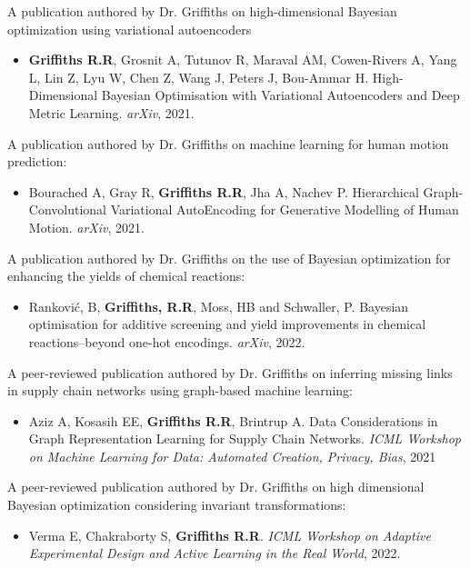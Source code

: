 \documentclass[11pt]{article}
\begin{document}
\begin{thebibliography}{9}
A publication authored by Dr. Griffiths on high-dimensional Bayesian optimization using variational autoencoders
\begin{itemize}
\item \textbf{Griffiths R.R}, Grosnit A, Tutunov R, Maraval AM, Cowen-Rivers A, Yang L, Lin Z, Lyu W, Chen Z, Wang J, Peters J, Bou-Ammar H. High-Dimensional Bayesian Optimisation with Variational Autoencoders and Deep Metric Learning. \textit{arXiv}, 2021.
\end{itemize}

A publication authored by Dr. Griffiths on machine learning for human motion prediction:
\begin{itemize}
\item Bourached A, Gray R, \textbf{Griffiths R.R}, Jha A, Nachev P. Hierarchical Graph-Convolutional Variational AutoEncoding for Generative Modelling of Human Motion. \textit{arXiv}, 2021.
\end{itemize}

A publication authored by Dr. Griffiths on the use of Bayesian optimization for enhancing the yields of chemical reactions:
\begin{itemize}
\item Ranković, B, \textbf{Griffiths, R.R}, Moss, HB and Schwaller, P. Bayesian optimisation for additive screening and yield improvements in chemical reactions–beyond one-hot encodings. \textit{arXiv}, 2022.
\end{itemize}

A peer-reviewed publication authored by Dr. Griffiths on inferring missing links in supply chain networks using graph-based machine learning:
\begin{itemize}
\item Aziz A, Kosasih EE, \textbf{Griffiths R.R}, Brintrup A. Data Considerations in Graph Representation Learning for Supply Chain Networks. \textit{ICML Workshop on Machine Learning for Data: Automated Creation, Privacy, Bias}, 2021 
\end{itemize}

A peer-reviewed publication authored by Dr. Griffiths on high dimensional Bayesian optimization considering invariant transformations:
\begin{itemize}
\item Verma E, Chakraborty S, \textbf{Griffiths R.R}. \textit{ICML Workshop on Adaptive Experimental Design and Active Learning in the Real World}, 2022.
\end{itemize}


\end{thebibliography}
\end{document}
